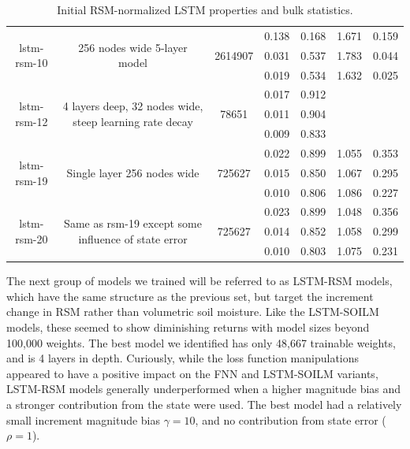 \begin{table}[H]
\begin{sideways}
\begin{tabular}{c|c|c|c|c|c|c }
\hline
\multirow{3}{6em}{lstm-rsm-10} & \multirow{3}{16em}{256 nodes wide 5-layer model} & \multirow{3}{4em}{2614907} & 0.138 & 0.168 & 1.671 & 0.159 \\ & & & 0.031 & 0.537 & 1.783 & 0.044 \\ & & & 0.019 & 0.534 & 1.632 & 0.025 \\
\hline
\multirow{3}{6em}{lstm-rsm-12} & \multirow{3}{16em}{4 layers deep, 32 nodes wide, steep learning rate decay} & \multirow{3}{4em}{78651} & 0.017 & 0.912 &  &  \\ & & & 0.011 & 0.904 &  &  \\ & & & 0.009 & 0.833 &  &  \\
\hline
\multirow{3}{6em}{lstm-rsm-19} & \multirow{3}{16em}{Single layer 256 nodes wide} & \multirow{3}{4em}{725627} & 0.022 & 0.899 & 1.055 & 0.353 \\ & & & 0.015 & 0.850 & 1.067 & 0.295 \\ & & & 0.010 & 0.806 & 1.086 & 0.227 \\
\hline
\multirow{3}{6em}{lstm-rsm-20} & \multirow{3}{16em}{Same as rsm-19 except some influence of state error} & \multirow{3}{4em}{725627} & 0.023 & 0.899 & 1.048 & 0.356 \\ & & & 0.014 & 0.852 & 1.058 & 0.299 \\ & & & 0.010 & 0.803 & 1.075 & 0.231 \\
    \end{tabular}
\centering
\end{sideways}
    \caption{Initial RSM-normalized LSTM properties and bulk statistics.}
\end{table}

The next group of models we trained will be referred to as LSTM-RSM models, which have the same structure as the previous set, but target the increment change in RSM rather than volumetric soil moisture. Like the LSTM-SOILM models, these seemed to show diminishing returns with model sizes beyond 100,000 weights. The best model we identified has only 48,667 trainable weights, and is 4 layers in depth. Curiously, while the loss function manipulations appeared to have a positive impact on the FNN and LSTM-SOILM variants, LSTM-RSM models generally underperformed when a higher magnitude bias and a stronger contribution from the state were used. The best model had a relatively small increment magnitude bias $\gamma=10$, and no contribution from state error ($\rho=1$).


